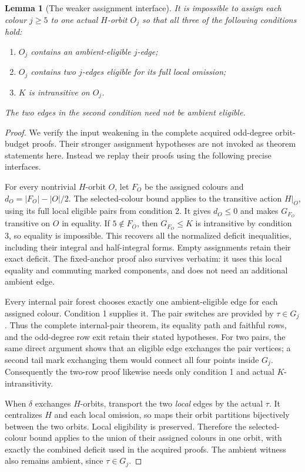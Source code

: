 \documentclass[11pt,a4paper]{article}
\newtheorem{lemma}{Lemma}
\begin{document}
\begin{lemma}[The weaker assignment interface]
It is impossible to assign each colour $j\ge5$ to
one actual $H$-orbit $O_j$ so that all three of the
following conditions hold:
\begin{enumerate}
\item $O_j$ contains an ambient-eligible $j$-edge;
\item $O_j$ contains two $j$-edges eligible for its
      full local omission;
\item $K$ is intransitive on $O_j$.
\end{enumerate}
The two edges in the second condition need not be
ambient eligible.
\end{lemma}
\begin{proof}
We verify the input weakening in the complete acquired
odd-degree orbit-budget proofs. Their stronger
assignment hypotheses are not invoked as theorem
statements here. Instead we replay their proofs using
the following precise interfaces.

For every nontrivial $H$-orbit $O$, let $F_O$ be
the assigned colours and $d_O=|F_O|-|O|/2$.
The selected-colour bound applies to the transitive
action $H|_O$, using its full local eligible pairs
from condition 2. It gives $d_O\le0$ and makes
$G_{F_O}$ transitive on $O$ in equality. If $5\notin F_O$,
then $G_{F_O}\le K$ is intransitive by condition 3,
so equality is impossible. This recovers all the
normalized deficit inequalities, including their
integral and half-integral forms. Empty assignments
retain their exact deficit. The fixed-anchor proof
also survives verbatim: it uses this local equality
and commuting marked components, and does not need
an additional ambient edge.

Every internal pair forest chooses exactly one
ambient-eligible edge for each assigned colour.
Condition 1 supplies it. The pair switches are
provided by $\tau\in G_j$. Thus the complete
internal-pair theorem, its equality path and faithful
rows, and the odd-degree row exit retain their
stated hypotheses. For two pairs, the same direct
argument shows that an eligible edge exchanges the
pair vertices; a second tail mark exchanging them
would connect all four points inside $G_j$.
Consequently the two-row proof likewise needs only
condition 1 and actual $K$-intransitivity.

When $\delta$ exchanges $H$-orbits, transport the
two \emph{local} edges by the actual $\tau$.
It centralizes $H$ and each local omission, so
maps their orbit partitions bijectively between
the two orbits. Local eligibility is preserved.
Therefore the selected-colour bound applies to
the union of their assigned colours in one orbit,
with exactly the combined deficit used in the
acquired proofs. The ambient witness also remains
ambient, since $\tau\in G_j$.


\end{proof}
\end{document}
